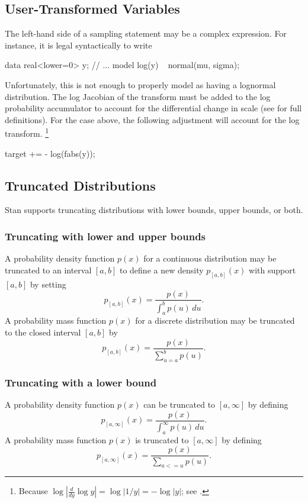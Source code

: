 \subsection{User-Transformed Variables}

The left-hand side of a sampling statement may be a complex
expression.  For instance, it is legal syntactically to write
%
\begin{stancode}
data {
  real<lower=0> y;
}
// ...
model {
  log(y) ~ normal(mu, sigma);
}
\end{stancode}
%
Unfortunately, this is not enough to properly model  as having
a lognormal distribution.  The log Jacobian of the transform must be
added to the log probability accumulator to account for the
differential change in scale (see  for
full definitions).  For the case above, the following adjustment will
account for the log transform.%
%
\footnote{Because $\log | \frac{d}{dy} \log y | = \log | 1/y | = - \log
  |y|$;  see .}
%
\begin{stancode}
target += - log(fabs(y));
\end{stancode}
%

\subsection{Truncated Distributions}

Stan supports truncating distributions with lower bounds, upper
bounds, or both.

\subsubsection{Truncating with lower and upper bounds}

A probability density function $p(x)$ for a continuous distribution
may be truncated to an interval $[a,b]$ to define a new density
$p_{[a,b]}(x)$ with support $[a,b]$ by setting
%
\[
p_{[a,b]}(x)
= \frac{p(x)}
       {\int_a^b p(u) \, du}.
\]
%
A probability mass function $p(x)$ for a discrete distribution may be
truncated to the closed interval $[a,b]$ by
\[
p_{[a,b]}(x) = \frac{p(x)}
                  {\sum_{u = a}^b p(u)}.
\]

\subsubsection{Truncating with a lower bound}

A probability density function $p(x)$ can be truncated to $[a, \infty]$ by
defining
%
\[
p_{[a,\infty]}(x)
= \frac{p(x)}
       {\int_a^{\infty} p(u) \, du}.
\]
%
A probability mass function $p(x)$ is truncated to $[a, \infty]$ by
defining 
%
\[
p_{[a,\infty]}(x) = \frac{p(x)}
                  {\sum_{a <= u} p(u)}.
\]


